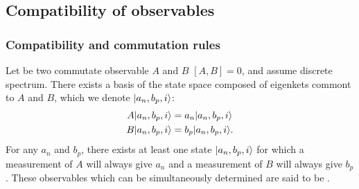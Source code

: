 \subsection{Compatibility of observables}
\subsubsection{Compatibility and commutation rules}
Let be two commutate observable $A$ and $B$ $[A,B]=0$, and assume discrete spectrum.
There exists a basis of the state space composed of eigenkets commont to $A$ and $B$, which we denote $|a_n,b_p,i\rangle$:
\begin{align*}
    A|a_n,b_p,i\rangle&=a_n|a_n,b_p,i\rangle\\
    B|a_n,b_p,i\rangle&=b_p|a_n,b_p,i\rangle.
\end{align*}
For any $a_n$ and $b_p$, there exists at least one state $|a_n,b_p,i\rangle$ for which a measurement of $A$ will always give $a_n$ and a 
measurement of $B$ will always give $b_p$. These observables which can be simultaneously determined are said to be .


